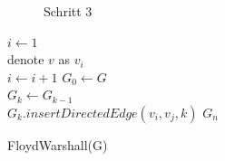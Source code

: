 \begin{figure}[ht!]
\begin{minipage}[t]{0.4\textwidth}
		\caption{Schritt 3}
		\label{fig:floyd-warshalv3}
		\end{minipage}
\end{figure}

\begin{algorithm}[H]
	$i \leftarrow 1$ \\
	{
		denote $v$ as $v_i$ \\
		$i \leftarrow i + 1$
	}
	$G_0 \leftarrow G$ \\
	{
		$G_k \leftarrow G_{k-1}$ \\
		{
			{
				{
					{
						$G_k.insertDirectedEdge(v_i, v_j, k)$
					}
				}
			}
		}
	}	
	\Return $G_n$
	\caption{FloydWarshall(G)}
\end{algorithm}

\clearpage

